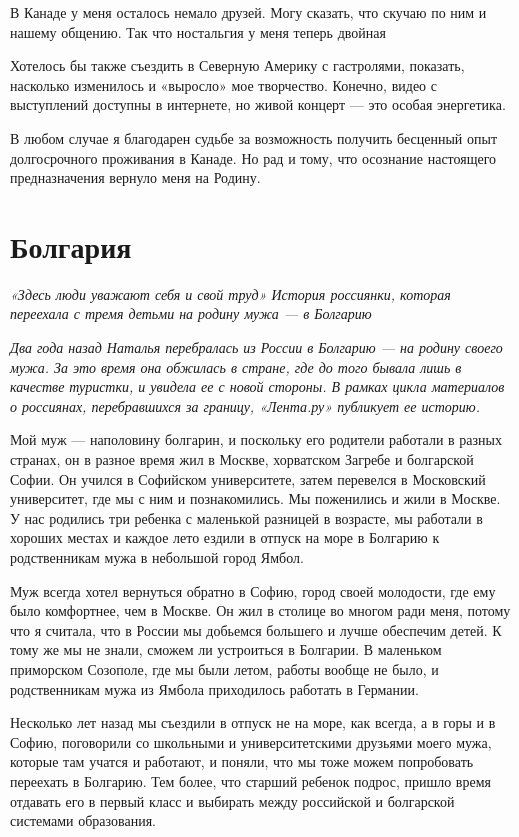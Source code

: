 \begin{fancyquotes}
    В Канаде у меня осталось немало друзей. Могу сказать, что скучаю по ним и нашему общению. Так что ностальгия у меня теперь двойная
\end{fancyquotes}

Хотелось бы также съездить в Северную Америку с гастролями, показать, насколько изменилось и «выросло» мое творчество. Конечно, видео с выступлений доступны в интернете, но живой концерт — это особая энергетика.

В любом случае я благодарен судьбе за возможность получить бесценный опыт долгосрочного проживания в Канаде. Но рад и тому, что осознание настоящего предназначения вернуло меня на Родину.


\newpage
\section{Болгария}

\textit{«Здесь люди уважают себя и свой труд» История россиянки, которая переехала с тремя детьми на родину мужа — в Болгарию}

\textit{Два года назад Наталья перебралась из России в Болгарию — на родину своего мужа. За это время она обжилась в стране, где до того бывала лишь в качестве туристки, и увидела ее с новой стороны. В рамках цикла материалов о россиянах, перебравшихся за границу, «Лента.ру» публикует ее историю.}

Мой муж — наполовину болгарин, и поскольку его родители работали в разных странах, он в разное время жил в Москве, хорватском Загребе и болгарской Софии. Он учился в Софийском университете, затем перевелся в Московский университет, где мы с ним и познакомились. Мы поженились и жили в Москве. У нас родились три ребенка с маленькой разницей в возрасте, мы работали в хороших местах и каждое лето ездили в отпуск на море в Болгарию к родственникам мужа в небольшой город Ямбол.

Муж всегда хотел вернуться обратно в Софию, город своей молодости, где ему было комфортнее, чем в Москве. Он жил в столице во многом ради меня, потому что я считала, что в России мы добьемся большего и лучше обеспечим детей. К тому же мы не знали, сможем ли устроиться в Болгарии. В маленьком приморском Созополе, где мы были летом, работы вообще не было, и родственникам мужа из Ямбола приходилось работать в Германии.

Несколько лет назад мы съездили в отпуск не на море, как всегда, а в горы и в Софию, поговорили со школьными и университетскими друзьями моего мужа, которые там учатся и работают, и поняли, что мы тоже можем попробовать переехать в Болгарию. Тем более, что старший ребенок подрос, пришло время отдавать его в первый класс и выбирать между российской и болгарской системами образования.

